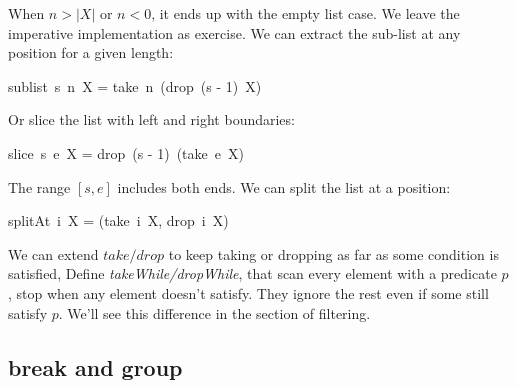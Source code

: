 \documentclass[b5paper]{article}
\begin{document}
When $n > |X|$ or $n < 0$, it ends up with the empty list case. We leave the imperative implementation as exercise. We can extract the sub-list at any position for a given length:

\be
sublist\ s\ n\ X = take\ n\ (drop\ (s - 1)\ X)
\ee

Or slice the list with left and right boundaries:

\be
slice\ s\ e\ X = drop\ (s - 1)\ (take\ e\ X)
\ee

The range $[s, e]$ includes both ends. We can split the list at a position:

\be
splitAt\ i\ X = (take\ i\ X, drop\ i\ X)
\label{eq:split-at}
\ee

 
We can extend $take/drop$ to keep taking or dropping as far as some condition is satisfied, Define \textit{takeWhile/dropWhile}, that scan every element with a predicate $p$, stop when any element doesn't satisfy. They ignore the rest even if some still satisfy $p$. We'll see this difference in the section of filtering.

\be
{}
\ee

\subsection{break and group}
 
\end{document}
